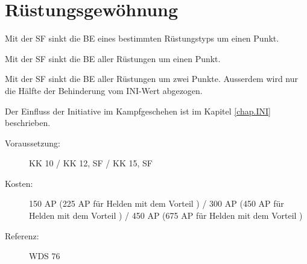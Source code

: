 \section{Rüstungsgewöhnung}
\label{sf.ruestungsgewoehnung}
Mit der SF  sinkt die BE eines bestimmten Rüstungstyps um einen Punkt.

Mit der SF  sinkt die BE aller Rüstungen um einen Punkt.

Mit der SF  sinkt die BE aller Rüstungen um zwei Punkte.
Ausserdem wird nur die Hälfte der Behinderung vom INI-Wert abgezogen.

Der Einfluss der Initiative im Kampfgeschehen ist im Kapitel \ref{chap.INI} beschrieben.
\begin{description}
    \item[Voraussetzung:]
        KK 10 / KK 12, SF  / KK 15, SF 
    \item [Kosten:]
        150 AP (225 AP für Helden mit dem Vorteil ) / 300 AP (450 AP für Helden mit dem Vorteil ) / 450 AP (675 AP für Helden mit dem Vorteil )
    \item [Referenz:]
        WDS 76
\end{description}
